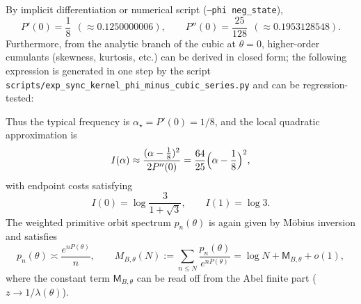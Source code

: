 By implicit differentiation or numerical script (\texttt{--phi neg\_state}),
\[
P'(0)=\frac{1}{8}\ \ (\approx 0.1250000006),\qquad
P''(0)=\frac{25}{128}\ \ (\approx 0.1953128548).
\]
Furthermore, from the analytic branch of the cubic at \(\theta=0\), higher-order cumulants (skewness, kurtosis, etc.) can be derived in closed form; the following expression is generated in one step by the script \texttt{scripts/exp\_sync\_kernel\_phi\_minus\_cubic\_series.py} and can be regression-tested:


Thus the typical frequency is $\alpha_\star=P'(0)=1/8$, and the local quadratic approximation is
\[
I(\alpha)\approx \frac{(\alpha-\frac18)^2}{2P''(0)}=\frac{64}{25}\Bigl(\alpha-\frac18\Bigr)^2,
\]
with endpoint costs satisfying
\[
I(0)=\log\frac{3}{1+\sqrt3},\qquad I(1)=\log 3.
\]
The weighted primitive orbit spectrum $p_n(\theta)$ is again given by M\"obius inversion and satisfies
\[
p_n(\theta)\asymp \frac{e^{nP(\theta)}}{n},
\qquad
M_{B,\theta}(N):=\sum_{n\le N}\frac{p_n(\theta)}{e^{nP(\theta)}}=\log N+\mathsf{M}_{B,\theta}+o(1),
\]
where the constant term $\mathsf{M}_{B,\theta}$ can be read off from the Abel finite part ($z\to 1/\lambda(\theta)$).

